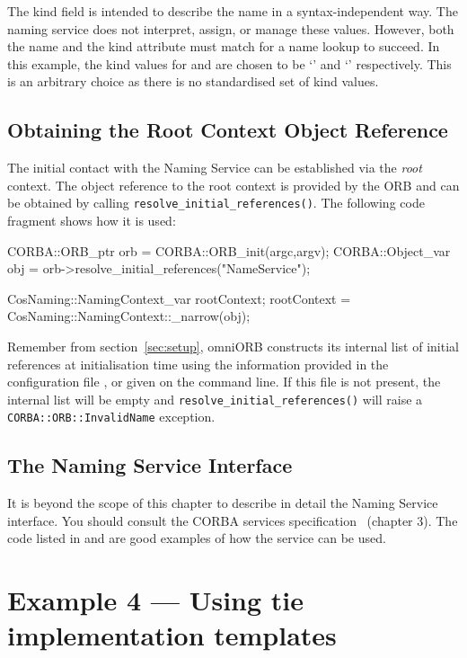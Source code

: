 \documentclass[11pt,oneside,a4paper]{book}
\newcommand{\code}[1]{\texttt{#1}}
\newcommand{\op}[1]{\texttt{#1()}}
\newcommand{\term}[1]{\textit{#1}}
\newcommand{\dsc}{\discretionary{}{}{}}
\begin{document}
The kind field is intended to describe the name in a
syntax-independent way. The naming service does not interpret, assign,
or manage these values. However, both the name and the kind attribute
must match for a name lookup to succeed. In this example, the kind
values for  and  are chosen to be
`' and `' respectively. This is an
arbitrary choice as there is no standardised set of kind values.



\subsection{Obtaining the Root Context Object Reference}
\label{resolveinit}

The initial contact with the Naming Service can be established via the
\term{root} context. The object reference to the root context is
provided by the ORB and can be obtained by calling
\op{resolve\_initial\_references}. The following code fragment shows
how it is used:

\begin{cxxlisting}
CORBA::ORB_ptr orb = CORBA::ORB_init(argc,argv);
CORBA::Object_var obj = orb->resolve_initial_references("NameService");

CosNaming::NamingContext_var rootContext;
rootContext = CosNaming::NamingContext::_narrow(obj);
\end{cxxlisting}

Remember from section~\ref{sec:setup}, omniORB constructs its internal
list of initial references at initialisation time using the
information provided in the configuration file , or
given on the command line. If this file is not present, the internal
list will be empty and \op{resolve\_initial\_references} will raise a
\code{CORBA::ORB::\dsc{}InvalidName} exception.

\subsection{The Naming Service Interface}

It is beyond the scope of this chapter to describe in detail the
Naming Service interface. You should consult the CORBA services
specification~\cite{corbaservices} (chapter 3). The code listed in
 and  are good examples of how the
service can be used.


\section{Example 4 --- Using tie implementation templates}
\label{sec:tie}
\end{document}
